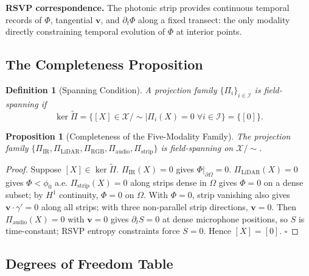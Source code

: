 \documentclass[12pt, oneside]{article}
\newtheorem{proposition}[theorem]{Proposition}
\newtheorem{definition}[theorem]{Definition}
\newcommand{\Xmod}{\mathcal{X}/{\sim}}
\newcommand{\Ftil}{\widetilde{\Pi}}
\begin{document}
\textbf{RSVP correspondence.} The photonic strip provides continuous temporal records of
$\Phi$, tangential $\mathbf{v}$, and $\partial_t \Phi$ along a fixed transect: the only
modality directly constraining temporal evolution of $\Phi$ at interior points.

\subsection{The Completeness Proposition}

\begin{definition}[Spanning Condition]
A projection family $\{\Pi_i\}_{i \in \mathcal{I}}$ is \emph{field-spanning} if
\[
\ker \Ftil = \{ [X] \in \Xmod \mid \Pi_i(X) = 0 \;\forall i \in \mathcal{I} \} = \{[0]\}.
\]
\end{definition}

\begin{proposition}[Completeness of the Five-Modality Family]
\label{prop:completeness}
The projection family $\{\Pi_{\mathrm{IR}}, \Pi_{\mathrm{LiDAR}}, \Pi_{\mathrm{RGB}},
\Pi_{\mathrm{audio}}, \Pi_{\mathrm{strip}}\}$ is field-spanning on $\Xmod$.
\end{proposition}

\begin{proof}
Suppose $[X] \in \ker \Ftil$. $\Pi_{\mathrm{IR}}(X) = 0$ gives
$\Phi|_{\partial\Omega} = 0$. $\Pi_{\mathrm{LiDAR}}(X) = 0$ gives $\Phi < \phi_0$
a.e. $\Pi_{\mathrm{strip}}(X) = 0$ along strips dense in $\Omega$ gives $\Phi = 0$
on a dense subset; by $H^1$ continuity, $\Phi = 0$ on $\Omega$. With $\Phi = 0$,
strip vanishing also gives $\mathbf{v} \cdot \gamma' = 0$ along all strips; with three
non-parallel strip directions, $\mathbf{v} = 0$. Then $\Pi_{\mathrm{audio}}(X) = 0$
with $\mathbf{v} = 0$ gives $\partial_t S = 0$ at dense microphone positions, so $S$
is time-constant; RSVP entropy constraints force $S = 0$. Hence $[X] = [0]$. $\square$
\end{proof}

\subsection{Degrees of Freedom Table}
\end{document}
